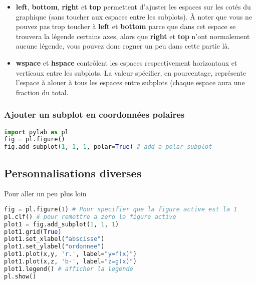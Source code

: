 \documentclass[a4paper,twoside]{article}
\begin{document}
\begin{itemize}
\item \textbf{left}, \textbf{bottom}, \textbf{right} et \textbf{top} permettent d'ajuster les espaces sur les cotés du graphique (sans toucher aux espaces entre les subplots). À noter que vous ne pouvez pas trop toucher à \textbf{left} et \textbf{bottom} parce que dans cet espace se trouvera la légende certains axes, alors que \textbf{right} et \textbf{top} n'ont normalement aucune légende, vous pouvez donc rogner un peu dans cette partie là.
\item \textbf{wspace} et \textbf{hspace} contrôlent les espaces respectivement horizontaux et verticaux entre les subplots. La valeur spécifier, en pourcentage, représente l'espace à alouer à tous les espaces entre subplots (chaque espace aura une fraction du total.
\end{itemize}

\subsubsection{Ajouter un subplot en coordonnées polaires}
\begin{lstlisting}[language=python]
import pylab as pl
fig = pl.figure()
fig.add_subplot(1, 1, 1, polar=True) # add a polar subplot
\end{lstlisting}

\subsection{Personnalisations diverses}
Pour aller un peu plus loin
\begin{lstlisting}[language=python]
fig = pl.figure(1) # Pour specifier que la figure active est la 1
pl.clf() # pour remettre a zero la figure active
plot1 = fig.add_subplot(1, 1, 1)
plot1.grid(True)
plot1.set_xlabel("abscisse")
plot1.set_ylabel("ordonnee")
plot1.plot(x,y, 'r.', label="y=f(x)")
plot1.plot(x,z, 'b-', label="z=g(x)")
plot1.legend() # afficher la legende
pl.show()
\end{lstlisting}
\end{document}
